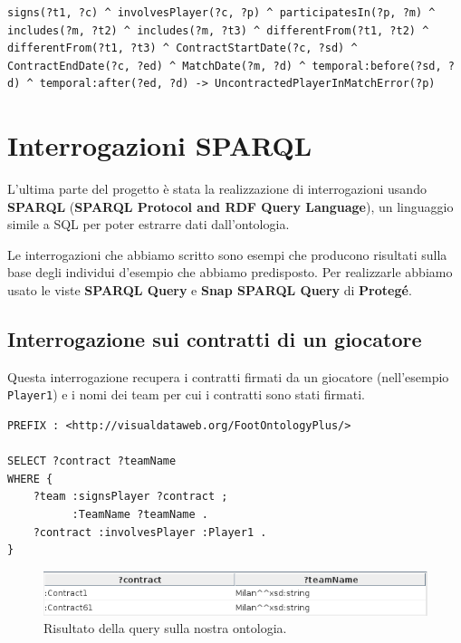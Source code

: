 \documentclass[11pt]{report} %
\begin{document}
\begin{itemize}[leftmargin=*]
\begin{lstlisting}[language=SWRL]
signs(?t1, ?c) ^ involvesPlayer(?c, ?p) ^ participatesIn(?p, ?m) ^ includes(?m, ?t2) ^ includes(?m, ?t3) ^ differentFrom(?t1, ?t2) ^ differentFrom(?t1, ?t3) ^ ContractStartDate(?c, ?sd) ^ ContractEndDate(?c, ?ed) ^ MatchDate(?m, ?d) ^ temporal:before(?sd, ?d) ^ temporal:after(?ed, ?d) -> UncontractedPlayerInMatchError(?p)
\end{lstlisting}
\chapter{Interrogazioni SPARQL}

L'ultima parte del progetto è stata la realizzazione di interrogazioni usando \textbf{SPARQL} (\textbf{SPARQL Protocol and RDF Query Language}), un linguaggio simile a SQL per poter estrarre dati dall'ontologia.

\hfill

Le interrogazioni che abbiamo scritto sono esempi che producono risultati sulla base degli individui d'esempio che abbiamo predisposto. 
Per realizzarle abbiamo usato le viste \textbf{SPARQL Query} e \textbf{Snap SPARQL Query} di \textbf{Protegé}. 

\section{Interrogazione sui contratti di un giocatore}

Questa interrogazione recupera i contratti firmati da un giocatore (nell'esempio \texttt{Player1}) e i nomi dei team per cui i contratti sono stati firmati. 

\begin{lstlisting}
PREFIX : <http://visualdataweb.org/FootOntologyPlus/>

SELECT ?contract ?teamName
WHERE { 
    ?team :signsPlayer ?contract ;
          :TeamName ?teamName .
    ?contract :involvesPlayer :Player1 .
}
\end{lstlisting}

\begin{figure}[H]
	\includegraphics[width=\textwidth]{query1}
	\caption{Risultato della query sulla nostra ontologia.}
\end{figure}

\newpage


\end{itemize}
\end{document}
